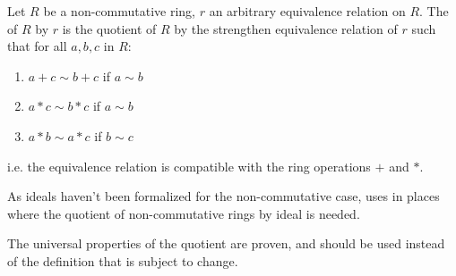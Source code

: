 \begin{definition}
    \label{RingQuot}
    \leanok

    Let $R$ be a non-commutative ring, $r$ an arbitrary equivalence relation on $R$.
    The  of $R$ by $r$
    is the quotient of $R$ by the strengthen equivalence relation of $r$
    such that for all $a, b, c$ in $R$:

    \begin{enumerate}

    \item $a + c \sim b + c$ if $a \sim b$
    \item $a * c \sim b * c$ if $a \sim b$
    \item $a * b \sim a * c$ if $b \sim c$
    
    \end{enumerate}

    i.e. the equivalence relation is compatible with the ring operations $+$ and $*$.

\end{definition}

\begin{remark}
    \label{mk:RingQuot}

    As ideals haven't been formalized for the non-commutative case, \Mathlib uses  in places
    where the quotient of non-commutative rings by ideal is needed.

    The universal properties of the quotient are proven, and should be used instead of the definition that is subject to change.
    
\end{remark}

